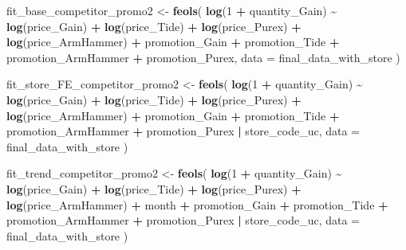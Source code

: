 \documentclass[
]{article}
\newenvironment{Shaded}{\begin{snugshade}}{\end{snugshade}}
\newcommand{\AttributeTok}[1]{\textcolor[rgb]{0.13,0.29,0.53}{#1}}
\newcommand{\DecValTok}[1]{\textcolor[rgb]{0.00,0.00,0.81}{#1}}
\newcommand{\FunctionTok}[1]{\textcolor[rgb]{0.13,0.29,0.53}{\textbf{#1}}}
\newcommand{\NormalTok}[1]{#1}
\newcommand{\OtherTok}[1]{\textcolor[rgb]{0.56,0.35,0.01}{#1}}
\newcommand{\SpecialCharTok}[1]{\textcolor[rgb]{0.81,0.36,0.00}{\textbf{#1}}}
\begin{document}
\begin{Shaded}
\begin{Highlighting}[]
\NormalTok{fit\_base\_competitor\_promo2 }\OtherTok{\textless{}{-}} \FunctionTok{feols}\NormalTok{(}
  \FunctionTok{log}\NormalTok{(}\DecValTok{1} \SpecialCharTok{+}\NormalTok{ quantity\_Gain) }\SpecialCharTok{\textasciitilde{}} \FunctionTok{log}\NormalTok{(price\_Gain) }\SpecialCharTok{+} \FunctionTok{log}\NormalTok{(price\_Tide) }\SpecialCharTok{+} \FunctionTok{log}\NormalTok{(price\_Purex) }
  \SpecialCharTok{+} \FunctionTok{log}\NormalTok{(price\_ArmHammer) }\SpecialCharTok{+}\NormalTok{ promotion\_Gain }\SpecialCharTok{+}\NormalTok{ promotion\_Tide }\SpecialCharTok{+}\NormalTok{ promotion\_ArmHammer}
  \SpecialCharTok{+}\NormalTok{ promotion\_Purex, }\AttributeTok{data =}\NormalTok{ final\_data\_with\_store}
\NormalTok{)}

\NormalTok{fit\_store\_FE\_competitor\_promo2 }\OtherTok{\textless{}{-}} \FunctionTok{feols}\NormalTok{(}
  \FunctionTok{log}\NormalTok{(}\DecValTok{1} \SpecialCharTok{+}\NormalTok{ quantity\_Gain) }\SpecialCharTok{\textasciitilde{}} \FunctionTok{log}\NormalTok{(price\_Gain) }\SpecialCharTok{+} \FunctionTok{log}\NormalTok{(price\_Tide) }\SpecialCharTok{+} \FunctionTok{log}\NormalTok{(price\_Purex)}
  \SpecialCharTok{+} \FunctionTok{log}\NormalTok{(price\_ArmHammer) }\SpecialCharTok{+}\NormalTok{ promotion\_Gain }\SpecialCharTok{+}\NormalTok{ promotion\_Tide }\SpecialCharTok{+}\NormalTok{ promotion\_ArmHammer}
  \SpecialCharTok{+}\NormalTok{ promotion\_Purex }\SpecialCharTok{|}\NormalTok{ store\_code\_uc,  }\AttributeTok{data =}\NormalTok{ final\_data\_with\_store}
\NormalTok{)}

\NormalTok{fit\_trend\_competitor\_promo2 }\OtherTok{\textless{}{-}} \FunctionTok{feols}\NormalTok{(}
  \FunctionTok{log}\NormalTok{(}\DecValTok{1} \SpecialCharTok{+}\NormalTok{ quantity\_Gain) }\SpecialCharTok{\textasciitilde{}} \FunctionTok{log}\NormalTok{(price\_Gain) }\SpecialCharTok{+} \FunctionTok{log}\NormalTok{(price\_Tide) }\SpecialCharTok{+} \FunctionTok{log}\NormalTok{(price\_Purex)}
  \SpecialCharTok{+} \FunctionTok{log}\NormalTok{(price\_ArmHammer) }\SpecialCharTok{+}\NormalTok{ month }\SpecialCharTok{+}\NormalTok{ promotion\_Gain }\SpecialCharTok{+}\NormalTok{ promotion\_Tide }\SpecialCharTok{+} 
\NormalTok{    promotion\_ArmHammer }\SpecialCharTok{+}\NormalTok{ promotion\_Purex }\SpecialCharTok{|}\NormalTok{ store\_code\_uc, }
  \AttributeTok{data =}\NormalTok{ final\_data\_with\_store}
\NormalTok{)}


\end{Highlighting}
\end{Shaded}
\end{document}
